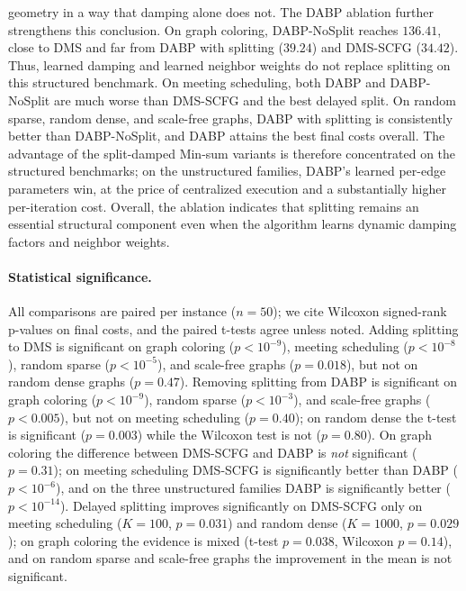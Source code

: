 \documentclass[letterpaper]{article} %
\theoremstyle{definition}
\theoremstyle{remark}
\begin{document}
geometry in a way that damping alone does not.
The DABP ablation further strengthens this conclusion.  On graph coloring,
DABP-NoSplit reaches $136.41$, close to DMS and far from DABP with splitting
($39.24$) and DMS-SCFG ($34.42$).  Thus, learned damping and learned neighbor
weights do not replace splitting on this structured benchmark.  On meeting
scheduling, both DABP and DABP-NoSplit are much worse than DMS-SCFG and the
best delayed split.  On random sparse, random dense, and scale-free graphs,
DABP with splitting is consistently better than DABP-NoSplit, and DABP attains
the best final costs overall.  The advantage of the split-damped Min-sum
variants is therefore concentrated on the structured benchmarks; on the
unstructured families, DABP's learned per-edge parameters win, at the price of
centralized execution and a substantially higher per-iteration cost.  Overall,
the ablation indicates that splitting remains an essential structural component
even when the algorithm learns dynamic damping factors and neighbor weights.

\paragraph{Statistical significance.}
All comparisons are paired per instance ($n = 50$); we cite Wilcoxon
signed-rank p-values on final costs, and the paired t-tests agree unless noted.
Adding splitting to DMS is significant on graph coloring ($p < 10^{-9}$),
meeting scheduling ($p < 10^{-8}$), random sparse ($p < 10^{-5}$), and
scale-free graphs ($p = 0.018$), but not on random dense graphs ($p = 0.47$).
Removing splitting from DABP is significant on graph coloring
($p < 10^{-9}$), random sparse ($p < 10^{-3}$), and scale-free graphs
($p < 0.005$), but not on meeting scheduling ($p = 0.40$); on random dense
the t-test is significant ($p = 0.003$) while the Wilcoxon test is not
($p = 0.80$).  On graph coloring the difference between DMS-SCFG and DABP is
\emph{not} significant ($p = 0.31$); on meeting scheduling DMS-SCFG is
significantly better than DABP ($p < 10^{-6}$), and on the three unstructured
families DABP is significantly better ($p < 10^{-14}$).  Delayed splitting
improves significantly on DMS-SCFG only on meeting scheduling ($K{=}100$,
$p = 0.031$) and random dense ($K{=}1000$, $p = 0.029$); on graph coloring the
evidence is mixed (t-test $p = 0.038$, Wilcoxon $p = 0.14$), and on random
sparse and scale-free graphs the improvement in the mean is not significant.
\end{document}
